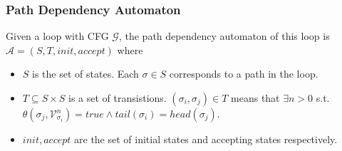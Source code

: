 \documentclass[11pt]{beamer}
\begin{document}
\begin{frame}\frametitle{Path Dependency Automaton}
\begin{definition}
Given a loop with CFG $\mathcal{G}$, the path dependency automaton of this loop is $\mathcal{A} = (S,T, init, accept)$ where 
\begin{itemize}
\item $S$ is the set of states. Each $\sigma \in S$ corresponds to a path in the loop.
\item $T \subseteq S \times S $ is a set of transistions. $(\sigma_i, \sigma_j)\in T$ means that $\exists n > 0$ s.t. $\theta(\sigma_j, \mathcal{V}_{\sigma_i}^n) = true\wedge tail(\sigma_i) = head(\sigma_j)$.
\item $init, accept$ are the set of initial states and accepting states respectively.

\end{itemize}
\end{definition}
\end{frame}
\end{document}
